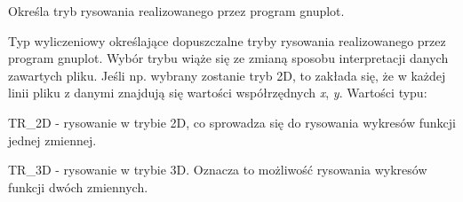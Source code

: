 Określa tryb rysowania realizowanego przez program {\ttfamily gnuplot}. 

Typ wyliczeniowy określające dopuszczalne tryby rysowania realizowanego przez program {\ttfamily gnuplot}. Wybór trybu wiąże się ze zmianą sposobu interpretacji danych zawartych pliku. Jeśli np. wybrany zostanie tryb 2D, to zakłada się, że w każdej linii pliku z danymi znajdują się wartości współrzędnych {\itshape x}, {\itshape y}. Wartości typu\+: \begin{DoxyItemize}
\item {\ttfamily T\+R\+\_\+2D} -\/ rysowanie w trybie 2D, co sprowadza się do rysowania wykresów funkcji jednej zmiennej. \item {\ttfamily T\+R\+\_\+3D} -\/ rysowanie w trybie 3D. Oznacza to możliwość rysowania wykresów funkcji dwóch zmiennych. \end{DoxyItemize}
